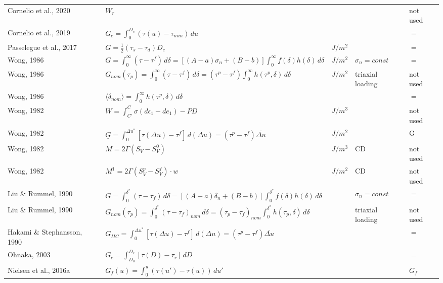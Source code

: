 \documentclass{article}
\begin{document}
\begin{longtable}{|p{4 cm}|p{8 cm}|p{1.25 cm}|p{1.25 cm}|p{1.5 cm}|}
Cornelio et al., 2020 & \( \displaystyle W_r \) & & & not used \\
Cornelio et al., 2019 & \( \displaystyle G_c = \int_{0}^{D_c} (\tau(u) - \tau_{min}) \,d u \) & & & $=$ \\
Passelegue et al., 2017 & \( \displaystyle G = \frac{1}{2} (\tau_s - \tau_d) D_c \) & $J/m^2$ & & $=$ \\
Wong, 1986 & \( \displaystyle G = \int_{0}^{\infty} (\tau - \tau^f) \,d \delta = [(A-a)\sigma_n + (B-b)] \int_{0}^{\infty} f(\delta) h(\delta) \,d \delta \) & $J/m^2$ & $\sigma_n = const $ & $=$ \\
Wong, 1986 & \( \displaystyle G_{nom}(\tau_p) = \int_{0}^{\infty} (\tau-\tau^f) \,d\delta = (\tau^p-\tau^f) \int_{0}^{\infty} h(\tau^p,\delta) \,d\delta \) & $J/m^2$ & triaxial loading & not used \\
Wong, 1986 & \( \displaystyle \langle \delta_{nom} \rangle = \int_{0}^{\infty} h(\tau^p,\delta) \,d\delta \) & & & $=$ \\
Wong, 1982 & \( \displaystyle W = \int_{C'}^{C} \sigma(d \epsilon_1 - d e_1) - P D \) & $J/m^3$ & & not used \\
Wong, 1982 & \( \displaystyle \underline{G} = \int_{0}^{\Delta u^*} [\tau(\Delta u) -\tau^f] \,d(\Delta u) = (\tau^p-\tau^f) \overline{\Delta u} \) & $J/m^2$ & & G \\
Wong, 1982 & \( \displaystyle M = 2 \Gamma (S_V - S_V^0) \) & $J/m^3$ & CD & not used \\
Wong, 1982 & \( \displaystyle M^1 = 2 \Gamma (S_V^p - S_V^f) \cdot w \) & $J/m^2$ & CD & not used \\
Liu \& Rummel, 1990 & \( \displaystyle G = \int_{0}^{\delta^*} (\tau - \tau_f) \,d\delta = [(A-a)\delta_n + (B-b)] \int_{0}^{\delta^*} f(\delta) h(\delta) \,d\delta \) & & $\sigma_n = const$ & $=$ \\
Liu \& Rummel, 1990 & \( \displaystyle G_{nom}(\tau_p) = \int_{0}^{\delta^*} (\tau - \tau_f)_{nom} \,d\delta = (\tau_p-\tau_f)_{nom} \int_{0}^{\delta^*} h(\tau_p,\delta) \,d\delta \) & & triaxial loading & not used \\
Hakami \& Stephansson, 1990 & \( \displaystyle G_{IIC} = \int_{0}^{\Delta u^*} [\tau(\Delta u) - \tau^f] \,d(\Delta u) = (\tau^p - \tau^f) \overline{\Delta u} \) & & & $=$ \\
Ohnaka, 2003 & \( \displaystyle G_c = \int_{D_0}^{D_c} [\tau(D)-\tau_r] \,dD \) & & & $=$ \\
Nielsen et al., 2016a & \( \displaystyle G_f(u) = \int_{0}^{u} (\tau(u') - \tau(u)) \,du' \) & & & $G_f$ \\

\end{longtable}
\end{document}
